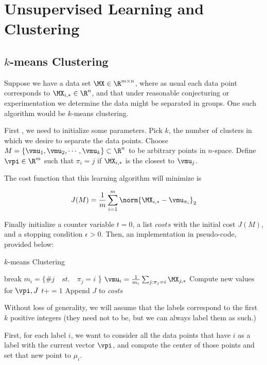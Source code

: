 \chapter{Unsupervised Learning and Clustering}

\section{\texorpdfstring{$k$}{k}-means Clustering}

Suppose we have a data set $\MX\in\R^{m \times n}$, where as usual each data point corresponds to $\MX_{i,*}\in\R^n$, and that under reasonable conjecturing or experimentation we determine the data might be separated in groups. One such algorithm would be $k$-means clustering.

First , we need to initialize some parameters. Pick $k$, the number of clusters in which we desire to separate the data points. Choose $M=\{\vmu_1, \vmu_2, \cdots, \vmu_k\} \subset\R^n$ to be arbitrary points in $n$-space. Define $\vpi\in\R^m$ such that $\pi_i = j$ if $\MX_{i,*}$ is the closest to $\vmu_j$. 

The cost function that this learning algorithm will minimize is

$$J(M) = \frac{1}{m} \sum_{i=1}^{m} \norm{ \MX_{i,*} - \vmu_{\pi_i}}_2 $$ 

Finally initialize a counter variable $t=0$, a list $\textit{costs}$ with the initial cost $J(M)$, and a stopping condition $\epsilon>0$. Then, an implementation in pseudo-code, provided below:

\begin{algorithm}
    \caption{$k$-means Clustering}
    \begin{algorithmic}[1]
		\State break
		\EndIf
        \State $m_i =\{ \#j \quad st. \quad \pi_j = i$ \}
        \State $\vmu_i = \frac{1}{m_i}\sum_{j:\pi_j=i} \MX_{j,*}$
		\EndFor
		\State Compute new values for $\vpi, J$
		\State $t+=1$
		\State Append $J$ to \textit{costs}
		\EndWhile
	\end{algorithmic} 
\end{algorithm}

Without loss of generality, we will assume that the labels correspond to the first $k$ positive integers (they need not to be, but we can always label them as such.)

First, for each label $i$, we want to consider all the data points that have $i$ as a label with the current vector $\vpi$, and compute the center of those points and set that new point to $\mu_i$.

